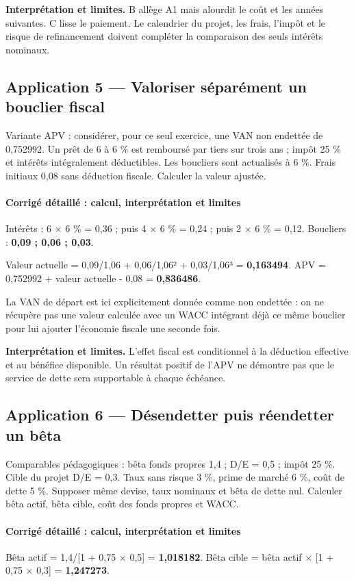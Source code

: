 \documentclass[12pt,a4paper]{article}
\begin{document}
\textbf{Interprétation et limites.} B allège A1 mais alourdit le coût et les années suivantes. C lisse le paiement. Le calendrier du projet, les frais, l’impôt et le risque de refinancement doivent compléter la comparaison des seuls intérêts nominaux.


\subsection*{Application 5 --- Valoriser séparément un bouclier fiscal}
Variante APV : considérer, pour ce seul exercice, une VAN non endettée de 0,752992. Un prêt de 6 à 6 \% est remboursé par tiers sur trois ans ; impôt 25 \% et intérêts intégralement déductibles. Les boucliers sont actualisés à 6 \%. Frais initiaux 0,08 sans déduction fiscale. Calculer la valeur ajustée.


\paragraph{Corrigé détaillé : calcul, interprétation et limites}
Intérêts : 6 $\times$ 6 \% = 0,36 ; puis 4 $\times$ 6 \% = 0,24 ; puis 2 $\times$ 6 \% = 0,12. Boucliers : \textbf{0,09 ; 0,06 ; 0,03}.

Valeur actuelle = 0,09/1,06 + 0,06/1,06² + 0,03/1,06³ = \textbf{0,163494}. APV = 0,752992 + valeur actuelle - 0,08 = \textbf{0,836486}.

La VAN de départ est ici explicitement donnée comme non endettée : on ne récupère pas une valeur calculée avec un WACC intégrant déjà ce même bouclier pour lui ajouter l’économie fiscale une seconde fois.

\textbf{Interprétation et limites.} L’effet fiscal est conditionnel à la déduction effective et au bénéfice disponible. Un résultat positif de l’APV ne démontre pas que le service de dette sera supportable à chaque échéance.


\subsection*{Application 6 --- Désendetter puis réendetter un bêta}
Comparables pédagogiques : bêta fonds propres 1,4 ; D/E = 0,5 ; impôt 25 \%. Cible du projet D/E = 0,3. Taux sans risque 3 \%, prime de marché 6 \%, coût de dette 5 \%. Supposer même devise, taux nominaux et bêta de dette nul. Calculer bêta actif, bêta cible, coût des fonds propres et WACC.


\paragraph{Corrigé détaillé : calcul, interprétation et limites}
Bêta actif = 1,4/[1 + 0,75 $\times$ 0,5] = \textbf{1,018182}. Bêta cible = bêta actif $\times$ [1 + 0,75 $\times$ 0,3] = \textbf{1,247273}.
\end{document}
